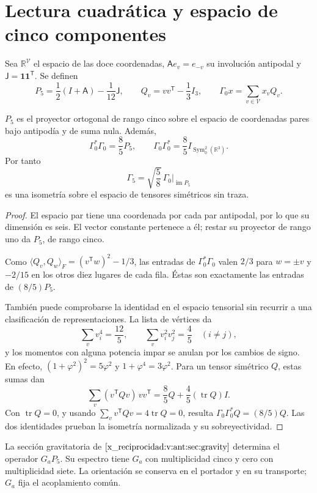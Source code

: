 \section{Lectura cuadrática y espacio de cinco componentes}
Sea \(\mathbb R^{\mathcal V}\) el espacio de las doce coordenadas,
\(\mathsf A e_v=e_{-v}\) su involución antipodal y
\(\mathsf J=\mathbf1\mathbf1^{\mathsf T}\). Se definen
\[
 P_5=\frac12(I+\mathsf A)-\frac1{12}\mathsf J,\qquad
 Q_v=vv^{\mathsf T}-\frac13I_3,\qquad
 \Gamma_0x=\sum_{v\in\mathcal V}x_vQ_v.
\]
\begin{theorem}
\label{x_reciprocidad:vii:thm:portador-pentacomponente}
\(P_5\) es el proyector ortogonal de rango cinco sobre el espacio de
coordenadas pares bajo antipodía y de suma nula. Además,
\[
 \Gamma_0^*\Gamma_0=\frac85P_5,\qquad
 \Gamma_0\Gamma_0^*=\frac85I_{\operatorname{Sym}^2_0(\mathbb R^3)}.
\]
Por tanto
\[
 \Gamma_5=\sqrt{\frac58}\,\Gamma_0|_{\operatorname{im}P_5}
\]
es una isometría sobre el espacio de tensores simétricos sin traza.
\end{theorem}
\begin{proof}
El espacio par tiene una coordenada por cada par antipodal, por lo que
su dimensión es seis. El vector constante pertenece a él; restar su
proyector de rango uno da \(P_5\), de rango cinco.

Como
\(\langle Q_v,Q_w\rangle_F=(v^{\mathsf T}w)^2-1/3\), las entradas
de \(\Gamma_0^*\Gamma_0\) valen \(2/3\) para \(w=\pm v\) y
\(-2/15\) en los otros diez lugares de cada fila. Éstas son
exactamente las entradas de \((8/5)P_5\).

También puede comprobarse la identidad en el espacio tensorial sin
recurrir a una clasificación de representaciones. La lista de vértices da
\[
 \sum_vv_i^4=\frac{12}{5},\qquad
 \sum_vv_i^2v_j^2=\frac45\quad(i\ne j),
\]
y los momentos con alguna potencia impar se anulan por los cambios de
signo. En efecto,
\((1+\varphi^2)^2=5\varphi^2\) y \(1+\varphi^4=3\varphi^2\).
Para un tensor simétrico \(Q\), estas sumas dan
\[
 \sum_v(v^{\mathsf T}Qv)\,vv^{\mathsf T}
 =\frac85Q+\frac45(\operatorname{tr}Q)I.
\]
Con \(\operatorname{tr}Q=0\), y usando
\(\sum_vv^{\mathsf T}Qv=4\operatorname{tr}Q=0\), resulta
\(\Gamma_0\Gamma_0^*Q=(8/5)Q\). Las dos identidades prueban
la isometría normalizada y su sobreyectividad.
\end{proof}

La sección gravitatoria de \(\ref{x_reciprocidad:v:ant:sec:gravity}\) determina el
operador \(G_aP_5\). Su espectro tiene \(G_a\) con multiplicidad
cinco y cero con multiplicidad siete. La orientación se conserva en
el portador y en su transporte; \(G_a\) fija el acoplamiento común.

